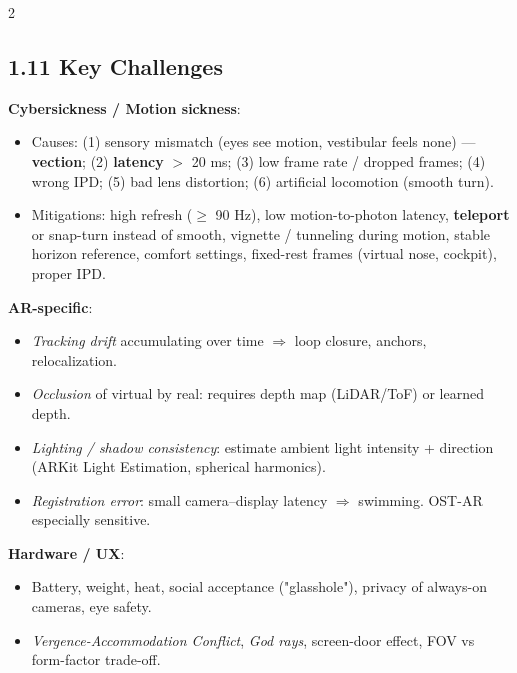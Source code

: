 \begin{paracol}{2}
\switchcolumn*

\subsection*{1.11 Key Challenges}
\textbf{Cybersickness / Motion sickness}:
\begin{itemize}[leftmargin=*,nosep]
  \item Causes: (1) sensory mismatch (eyes see motion, vestibular feels none) — \textbf{vection}; (2) \textbf{latency} $>$ 20 ms; (3) low frame rate / dropped frames; (4) wrong IPD; (5) bad lens distortion; (6) artificial locomotion (smooth turn).
  \item Mitigations: high refresh ($\geq$ 90 Hz), low motion-to-photon latency, \textbf{teleport} or snap-turn instead of smooth, vignette / tunneling during motion, stable horizon reference, comfort settings, fixed-rest frames (virtual nose, cockpit), proper IPD.
\end{itemize}
\textbf{AR-specific}:
\begin{itemize}[leftmargin=*,nosep]
  \item \emph{Tracking drift} accumulating over time $\Rightarrow$ loop closure, anchors, relocalization.
  \item \emph{Occlusion} of virtual by real: requires depth map (LiDAR/ToF) or learned depth.
  \item \emph{Lighting / shadow consistency}: estimate ambient light intensity + direction (ARKit Light Estimation, spherical harmonics).
  \item \emph{Registration error}: small camera–display latency $\Rightarrow$ swimming. OST-AR especially sensitive.
\end{itemize}
\textbf{Hardware / UX}:
\begin{itemize}[leftmargin=*,nosep]
  \item Battery, weight, heat, social acceptance ("glasshole"), privacy of always-on cameras, eye safety.
  \item \emph{Vergence-Accommodation Conflict}, \emph{God rays}, screen-door effect, FOV vs form-factor trade-off.
\end{itemize}

\switchcolumn


\end{paracol}
